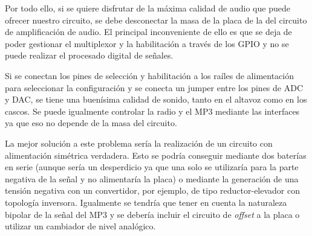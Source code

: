 Por todo ello, si se quiere disfrutar de la máxima calidad de audio que puede ofrecer nuestro circuito, se debe desconectar la masa de la placa de la del circuito de amplificación de audio. El principal inconveniente de ello es que se deja de poder gestionar el multiplexor y la habilitación a través de los GPIO y no se puede realizar el procesado digital de señales.

Si se conectan los pines de selección y habilitación a los raíles de alimentación para seleccionar la configuración y se conecta un jumper entre los pines de ADC y DAC, se tiene una buenísima calidad de sonido, tanto en el altavoz como en los cascos. Se puede igualmente controlar la radio y el MP3 mediante las interfaces ya que eso no depende de la masa del circuito.

La mejor solución a este problema sería la realización de un circuito con alimentación simétrica verdadera. Esto se podría conseguir mediante dos baterías en serie (aunque sería un desperdicio ya que una solo se utilizaría para la parte negativa de la señal y no alimentaría la placa) o mediante la generación de una tensión negativa con un convertidor, por ejemplo, de tipo reductor-elevador con topología inversora. Igualmente se tendría que tener en cuenta la naturaleza bipolar de la señal del MP3 y se debería incluir el circuito de \textit{offset} a la placa o utilizar un cambiador de nivel analógico.
